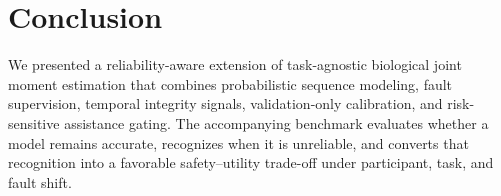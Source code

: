 \documentclass[letterpaper]{article} %
\begin{document}
\section{Conclusion}

We presented a reliability-aware extension of task-agnostic biological joint moment estimation that combines probabilistic sequence modeling, fault supervision, temporal integrity signals, validation-only calibration, and risk-sensitive assistance gating.
The accompanying benchmark evaluates whether a model remains accurate, recognizes when it is unreliable, and converts that recognition into a favorable safety--utility trade-off under participant, task, and fault shift.



\end{document}
